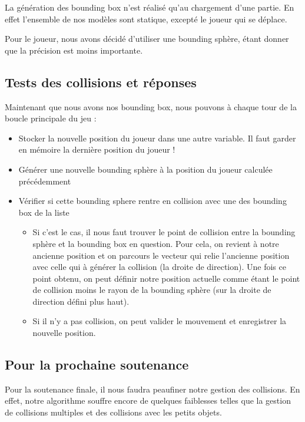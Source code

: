 \documentclass[11pt]{report}
\begin{document}
La génération des bounding box n'est réalisé qu'au chargement d'une partie. En effet l'ensemble de nos modèles sont statique, excepté le joueur qui se déplace.

Pour le joueur, nous avons décidé d'utiliser une bounding sphère, étant donner que la précision est moins importante.

\subsection{Tests des collisions et réponses}

Maintenant que nous avons nos bounding box, nous pouvons à chaque tour de la boucle principale du jeu :

\begin{itemize}
\item Stocker la nouvelle position du joueur dans une autre variable. Il faut garder en mémoire la dernière position du joueur !
\item Générer une nouvelle bounding sphère à la position du joueur calculée précédemment
\item Vérifier si cette bounding sphere rentre en collision avec une des bounding box de la liste
\begin{itemize}
\item Si c'est le cas, il nous faut trouver le point de collision entre la bounding sphère et la bounding box en question. Pour cela, on revient à notre ancienne position et on parcours le vecteur qui relie l'ancienne position avec celle qui à générer la collision (la droite de direction). Une fois ce point obtenu, on peut définir notre position actuelle comme étant le point de collision moins le rayon de la bounding sphère (sur la droite de direction défini plus haut).
\item Si il n'y a pas collision, on peut valider le mouvement et enregistrer la nouvelle position.
\end{itemize}
\end{itemize}

\subsection{Pour la prochaine soutenance}

Pour la soutenance finale, il nous faudra peaufiner notre gestion des collisions. En effet, notre algorithme souffre encore de quelques faiblesses telles que la gestion de collisions multiples et des collisions avec les petits objets.
\end{document}
